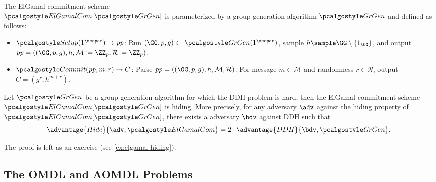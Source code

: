 \begin{definition}
  The ElGamal commitment scheme\\ $\algo{ElGamalCom}[\grgen]$ is parameterized by a group generation algorithm $\grgen$ and defined as follows:
  \begin{itemize}
  \item $\algo{Setup}(1^\secpar) \rightarrow \params$: Run $\gparam \gets \grgen(1^\secpar)$, sample $h \sample \GG \setminus \{1_\GG\}$, and output $\params = (\gparam, h, \mathcal{M} \defeq \ZZ_p, \mathcal{R} \defeq \ZZ_p)$.
  \item $\algo{Commit}(\params, m; r) \rightarrow C$: Parse $\params = ((\GG, p, g), h, \mathcal{M}, \mathcal{R})$. For message $m \in \mathcal{M}$ and randomness $r \in \mathcal{R}$, output $C = (g^r, h^{m+r})$.
  \end{itemize}
\end{definition}

\begin{theorem}\label{thm:elgamal-hiding}
  Let $\grgen$ be a group generation algorithm for which the DDH problem is hard, then the ElGamal commitment scheme $\algo{ElGamalCom}[\grgen]$ is hiding.
  More precisely, for any \ppt adversary $\adv$ against the hiding property of $\algo{ElGamalCom}[\grgen]$, there exists a \ppt adversary $\bdv$ against DDH such that
  \[
  \advantage{Hide}{\adv, \algo{ElGamalCom}} = 2 \cdot \advantage{DDH}{\bdv, \grgen}.
  \]
\end{theorem}

The proof is left as an exercise (see \autoref{ex:elgamal-hiding}).

\subsection{The OMDL and AOMDL Problems}

